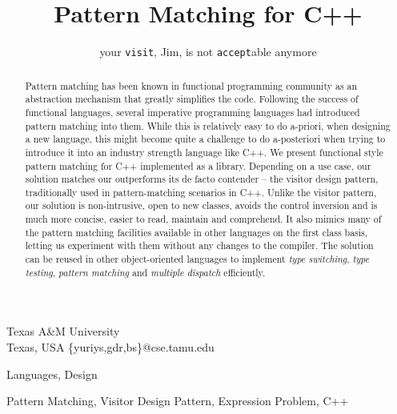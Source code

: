 \documentclass[preprint]{sigplanconf}
\DeclareRobustCommand{\code}[1]{{\lstinline[breaklines=false]{#1}}}
\begin{document}
\copyrightdata{[to be supplied]} 


\title{Pattern Matching for C++}
\subtitle{your \code{visit}, Jim, is not \code{accept}able anymore}

           {Texas A\&M University\\ Texas, USA}
           {\{yuriys,gdr,bs\}@cse.tamu.edu}

\maketitle

\begin{abstract}
Pattern matching has been known in functional programming community as an 
abstraction mechanism that greatly simplifies the code. Following the success of 
functional languages, several imperative programming languages had introduced 
pattern matching into them. While this is relatively easy to do a-priori, when 
designing a new language, this might become quite a challenge to do a-posteriori 
when trying to introduce it into an industry strength language like C++. We 
present functional style pattern matching for C++ implemented as a library. 
Depending on a use case, our solution matches our outperforms its de facto 
contender -- the visitor design pattern, traditionally used in pattern-matching 
scenarios in C++. Unlike the visitor pattern, our solution is non-intrusive, 
open to new classes, avoids the control inversion and is much more concise, 
easier to read, maintain and comprehend. It also mimics many of the pattern 
matching facilities available in other languages on the first class basis, 
letting us experiment with them without any changes to the compiler. The 
solution can be reused in other object-oriented languages to implement
\emph{type switching}, \emph{type testing}, \emph{pattern matching} and 
\emph{multiple dispatch} efficiently.
\end{abstract}


\terms
Languages, Design

\keywords
Pattern Matching, Visitor Design Pattern, Expression Problem, C++
\end{document}
